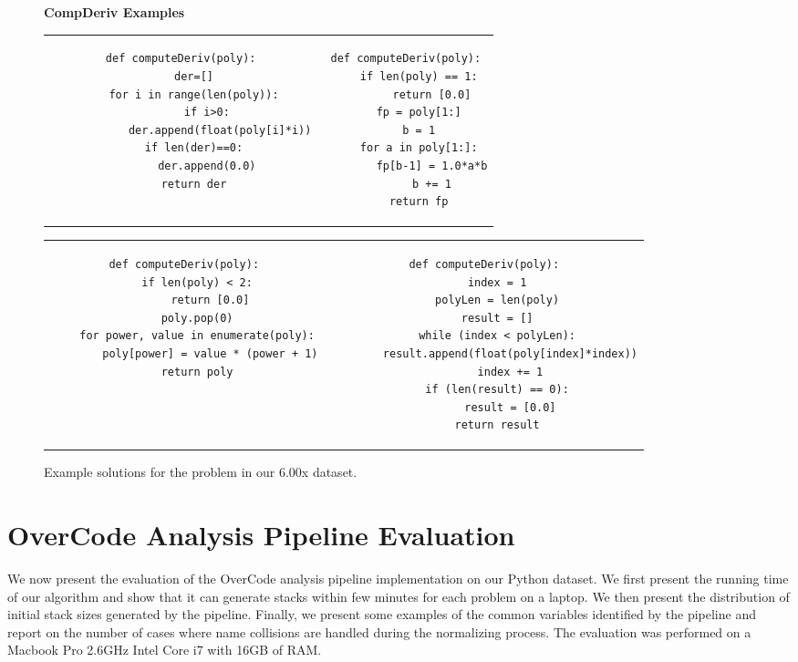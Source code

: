 \begin{figure}
{\bf CompDeriv Examples}\\
\begin{tabular}{cc} 
\begin{minipage}{0.5\linewidth}
\begin{lstlisting}[]
def computeDeriv(poly):
    der=[]
    for i in range(len(poly)):
        if i>0:
            der.append(float(poly[i]*i))
    if len(der)==0:
        der.append(0.0)
    return der

\end{lstlisting}
\end{minipage}
&
\begin{minipage}{0.5\linewidth}
\begin{lstlisting}[]
def computeDeriv(poly):
    if len(poly) == 1:
        return [0.0]
    fp = poly[1:]
    b = 1
    for a in poly[1:]:
        fp[b-1] = 1.0*a*b
        b += 1
    return fp
\end{lstlisting}
\end{minipage}
\\
\end{tabular}
\begin{tabular}{c c}
\begin{minipage}{0.4\linewidth}
\begin{lstlisting}[]
def computeDeriv(poly):
    if len(poly) < 2:
        return [0.0]
    poly.pop(0)
    for power, value in enumerate(poly):
        poly[power] = value * (power + 1)
    return poly
\end{lstlisting}
\end{minipage}
&
\begin{minipage}{0.4\linewidth}
\begin{lstlisting}[]
def computeDeriv(poly):
    index = 1
    polyLen = len(poly)
    result = []
    while (index < polyLen):
        result.append(float(poly[index]*index))
        index += 1
    if (len(result) == 0):
        result = [0.0]
    return result
\end{lstlisting}
\end{minipage}

\end{tabular}
\caption{Example solutions for the  problem in our 6.00x dataset.}
\label{cdexamples}
\end{figure}


\section{OverCode Analysis Pipeline Evaluation}
We now present the evaluation of the OverCode analysis pipeline implementation on our Python dataset. We first present the running time of our algorithm and show that it can generate stacks within few minutes for each problem on a laptop. We then present the distribution of initial stack sizes generated by the pipeline. Finally, we present some examples of the common variables identified by the pipeline and report on the number of cases where name collisions are handled during the normalizing process. The evaluation was performed on a Macbook Pro 2.6GHz Intel Core i7 with 16GB of RAM.  

